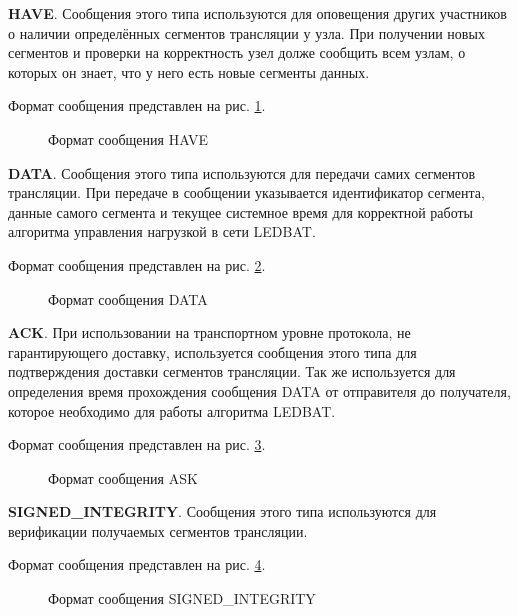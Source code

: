 		\textbf{HAVE}. Сообщения этого типа используются для оповещения других участников о наличии определённых
		сегментов трансляции у узла. При получении новых сегментов и проверки на корректность узел долже сообщить всем
		узлам, о которых он знает, что у него есть новые сегменты данных.

		Формат сообщения представлен на рис. \ref{img:ppspp-message-have}.
		\begin{figure}[h]
			\caption{Формат сообщения HAVE}
			\label{img:ppspp-message-have}
		\end{figure}

		\textbf{DATA}. Сообщения этого типа используются для передачи самих сегментов трансляции. При передаче в
		сообщении указывается идентификатор сегмента, данные самого сегмента и текущее системное время для корректной
		работы алгоритма управления нагрузкой в сети LEDBAT.

		Формат сообщения представлен на рис. \ref{img:ppspp-message-data}.
		\begin{figure}[h]
			\caption{Формат сообщения DATA}
			\label{img:ppspp-message-data}
		\end{figure}


		\textbf{ACK}. При использовании на транспортном уровне протокола, не гарантирующего доставку, используется
		сообщения этого типа для подтверждения доставки сегментов трансляции. Так же используется для определения
		время прохождения сообщения DATA от отправителя до получателя, которое необходимо для работы алгоритма
		LEDBAT.

		Формат сообщения представлен на рис. \ref{img:ppspp-message-ask}.
		\begin{figure}[h]
			\caption{Формат сообщения ASK}
			\label{img:ppspp-message-ask}
		\end{figure}


		\textbf{SIGNED\_INTEGRITY}. Сообщения этого типа используются для верификации получаемых сегментов трансляции.

		Формат сообщения представлен на рис. \ref{img:ppspp-message-signed-integrity}.
		\begin{figure}[h]
			\caption{Формат сообщения SIGNED\_INTEGRITY}
			\label{img:ppspp-message-signed-integrity}
		\end{figure}

